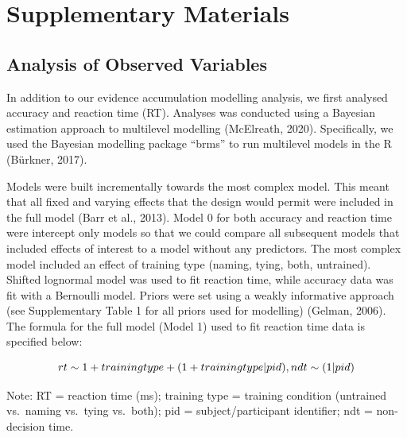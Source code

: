 \documentclass[
  man,floatsintext]{apa6}
\author{\phantom{0}}
\date{}
\affiliation{\phantom{0}}
\begin{document}
\section{Supplementary Materials}\label{supplementary-materials}

\subsection{Analysis of Observed Variables}\label{analysis-of-observed-variables}

In addition to our evidence accumulation modelling analysis, we first analysed accuracy and reaction time (RT). Analyses was conducted using a Bayesian estimation approach to multilevel modelling (McElreath, 2020). Specifically, we used the Bayesian modelling package ``brms'' to run multilevel models in the R (Bürkner, 2017).

Models were built incrementally towards the most complex model. This meant that all fixed and varying effects that the design would permit were included in the full model (Barr et al., 2013). Model 0 for both accuracy and reaction time were intercept only models so that we could compare all subsequent models that included effects of interest to a model without any predictors. The most complex model included an effect of training type (naming, tying, both, untrained). Shifted lognormal model was used to fit reaction time, while accuracy data was fit with a Bernoulli model. Priors were set using a weakly informative approach (see Supplementary Table 1 for all priors used for modelling) (Gelman, 2006). The formula for the full model (Model 1) used to fit reaction time data is specified below:

\[rt \sim 1 + training type + \\
(1 + training type | pid), \\
ndt \sim (1 | pid)\]

Note: RT = reaction time (ms); training type = training condition (untrained vs.~naming vs.~tying vs.~both); pid = subject/participant identifier; ndt = non-decision time.
\end{document}
